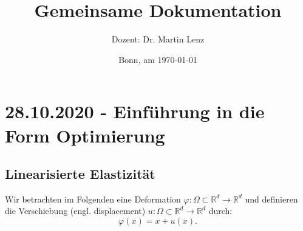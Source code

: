 \documentclass[a4paper, 12pt]{scrartcl}
\title{Gemeinsame Dokumentation 
	\vspace{1cm}
	\mygraphics{0.7\textwidth}{graphics/shop1}{}
}
\author{Dozent: Dr. Martin Lenz}
\date{Bonn, am \today{}}
\newcommand{\R}{\mathbb{R}}
\begin{document}

 \maketitle

 
\newpage





\section{28.10.2020 - Einführung in die Form Optimierung}


\subsection{Linearisierte Elastizität}
Wir betrachten im Folgenden eine Deformation $\varphi: \Omega \subset \R^d \to \R^d$ und definieren die Verschiebung (engl. displacement) $u: \Omega \subset \R^d \to \R^d$ durch:
\[ \varphi(x)=x+u(x).\]
\end{document}
